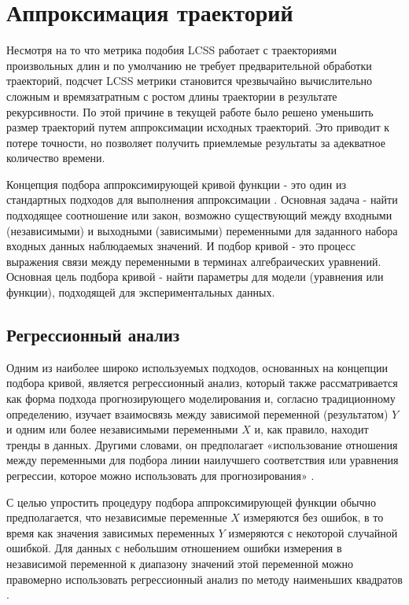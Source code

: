 \section{Аппроксимация траекторий}

Несмотря на то что метрика подобия LCSS работает с траекториями произвольных длин и по умолчанию не требует предварительной обработки траекторий, подсчет LCSS метрики становится чрезвычайно вычислительно сложным и времязатратным с ростом длины траектории в результате рекурсивности. По этой причине в текущей работе было решено уменьшить размер траекторий путем аппроксимации исходных траекторий. Это приводит к потере точности, но позволяет получить приемлемые результаты за адекватное количество времени.

Концепция подбора аппроксимирующей кривой функции - это один из стандартных подходов для выполнения аппроксимации \cite{article:behav_form_extr}. Основная задача - найти подходящее соотношение или закон, возможно существующий между входными (независимыми) и выходными (зависимыми) переменными для заданного набора входных данных наблюдаемых значений. И подбор кривой - это процесс выражения связи между переменными в терминах алгебраических уравнений. Основная цель подбора кривой - найти параметры для модели (уравнения или функции), подходящей для экспериментальных данных.

\subsection{Регрессионный анализ}

Одним из наиболее широко используемых подходов, основанных на концепции подбора кривой, является регрессионный анализ, который также рассматривается как форма подхода прогнозирующего моделирования и, согласно традиционному определению, изучает взаимосвязь между зависимой переменной (результатом) $Y$ и одним или более независимыми переменными $X$ и, как правило, находит тренды в данных. Другими словами, он предполагает «использование отношения между переменными для подбора линии наилучшего соответствия или уравнения регрессии, которое можно использовать для прогнозирования» \cite{online:intro_lr_pr}.

С целью упростить процедуру подбора аппроксимирующей функции обычно предполагается, что независимые переменные $X$ измеряются без ошибок, в то время как значения зависимых переменных $Y$ измеряются с некоторой случайной ошибкой. Для данных с небольшим отношением ошибки измерения в независимой переменной к диапазону значений этой переменной можно правомерно использовать регрессионный анализ по методу наименьших квадратов \cite{article:behav_form_extr}.

